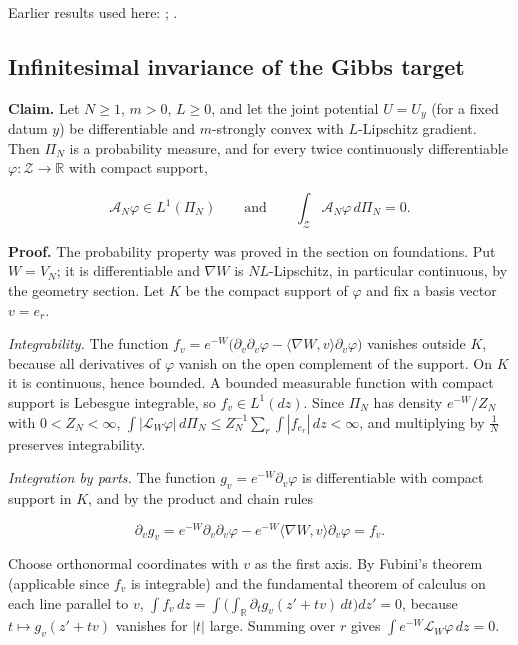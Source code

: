 \documentclass[11pt,a4paper]{report}
\begin{document}
Earlier results used here: \cite[Section~3.46.14]{LangevinLean2026ULASC}; \cite[Section~3.46.2]{LangevinLean2026ULASC}.
\subsection{\texorpdfstring{Infinitesimal invariance of the Gibbs target}{Infinitesimal invariance of the Gibbs target}}
\label{report-step-IPLA-Generator-lean-2}


\textbf{Claim.} Let \(N\ge1\), \(m>0\), \(L\ge0\), and let the joint potential \(U=U_y\) (for a fixed datum \(y\)) be differentiable and \(m\)-strongly convex with \(L\)-Lipschitz gradient. Then \(\Pi_N\) is a probability measure, and for every twice continuously differentiable \(\varphi:\mathcal Z\to\mathbb R\) with compact support,


\[\mathcal A_N\varphi\in L^1(\Pi_N)\qquad\text{and}\qquad\int_{\mathcal Z}\mathcal A_N\varphi\,d\Pi_N=0 .\]


\textbf{Proof.} The probability property was proved in the section on foundations. Put \(W=V_N\); it is differentiable and \(\nabla W\) is \(NL\)-Lipschitz, in particular continuous, by the geometry section. Let \(K\) be the compact support of \(\varphi\) and fix a basis vector \(v=e_r\).




\emph{Integrability.} The function \(f_v=e^{-W}\bigl(\partial_v\partial_v\varphi-\langle\nabla W,v\rangle\partial_v\varphi\bigr)\) vanishes outside \(K\), because all derivatives of \(\varphi\) vanish on the open complement of the support. On \(K\) it is continuous, hence bounded. A bounded measurable function with compact support is Lebesgue integrable, so \(f_v\in L^1(dz)\). Since \(\Pi_N\) has density \(e^{-W}/Z_N\) with \(0<Z_N<\infty\), \(\int|\mathcal L_W\varphi|\,d\Pi_N\le Z_N^{-1}\sum_r\int|f_{e_r}|\,dz<\infty\), and multiplying by \(\frac1N\) preserves integrability.




\emph{Integration by parts.} The function \(g_v=e^{-W}\partial_v\varphi\) is differentiable with compact support in \(K\), and by the product and chain rules


\[\partial_vg_v=e^{-W}\partial_v\partial_v\varphi-e^{-W}\langle\nabla W,v\rangle\partial_v\varphi=f_v .\]


Choose orthonormal coordinates with \(v\) as the first axis. By Fubini's theorem (applicable since \(f_v\) is integrable) and the fundamental theorem of calculus on each line parallel to \(v\), \(\int f_v\,dz=\int\bigl(\int_{\mathbb R}\partial_tg_v(z'+tv)\,dt\bigr)dz'=0\), because \(t\mapsto g_v(z'+tv)\) vanishes for \(|t|\) large. Summing over \(r\) gives \(\int e^{-W}\mathcal L_W\varphi\,dz=0\).
\end{document}
